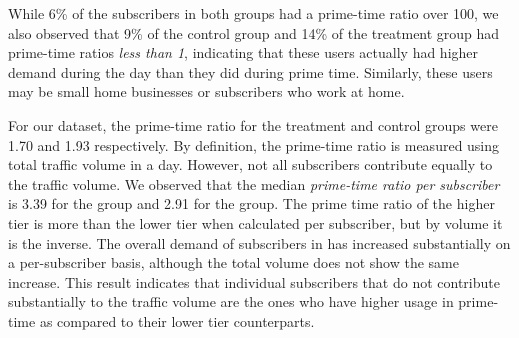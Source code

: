 While 6\% of the subscribers in both groups had a prime-time ratio over
100, we also observed that 9\% of the control group and 14\% of the
treatment group had prime-time ratios {\em less than 1}, indicating that
these users actually had higher demand during the day than they did
during prime time. Similarly, these users may be small home
businesses or subscribers who work at home.


For our dataset, the prime-time ratio for the treatment and control groups
were 1.70 and 1.93 respectively. By definition, the prime-time ratio is measured using
total traffic volume in a day. However, not all subscribers contribute equally
to the traffic volume. We observed that the median \emph{prime-time ratio per subscriber}
is 3.39 for the \treatment{} group and 2.91 for the \control{} group. 
The prime time ratio of the higher tier is more than the lower tier when calculated per
subscriber, but by volume it is the inverse.
The overall demand of subscribers in \treatment{} has increased substantially
on a per-subscriber basis, although the total volume does not show the same increase.
This result indicates that individual subscribers that do not contribute substantially
to the traffic volume are the ones who have higher usage in prime-time as compared to their
lower tier counterparts.
\fi

